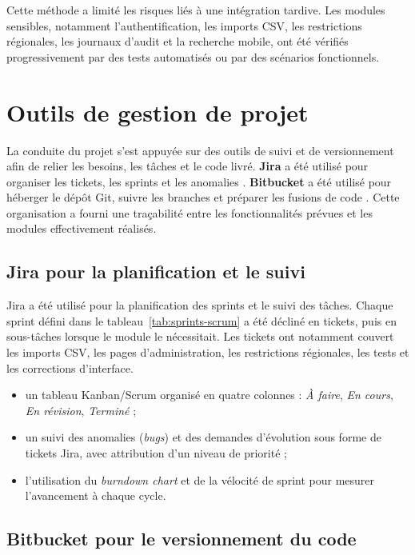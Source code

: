 Cette méthode a limité les risques liés à une intégration tardive. Les modules sensibles, notamment
l'authentification, les imports CSV, les restrictions régionales, les journaux d'audit et la recherche mobile,
ont été vérifiés progressivement par des tests automatisés ou par des scénarios fonctionnels.

\section{Outils de gestion de projet}
\label{sec:outils-gestion}

La conduite du projet s'est appuyée sur des outils de suivi et de versionnement afin de relier les besoins,
les tâches et le code livré. \textbf{Jira} a été utilisé pour organiser les tickets, les sprints et les
anomalies \cite{atlassian_jira_sprints}. \textbf{Bitbucket} a été utilisé pour héberger le dépôt Git, suivre les
branches et préparer les fusions de code \cite{atlassian_bitbucket_guides}. Cette organisation a fourni une traçabilité
entre les fonctionnalités prévues et les modules effectivement réalisés.

\subsection{Jira pour la planification et le suivi}

Jira a été utilisé pour la planification des sprints et le suivi des tâches. Chaque sprint défini dans le
tableau~\ref{tab:sprints-scrum} a été décliné en tickets, puis en sous-tâches lorsque le module le
nécessitait. Les tickets ont notamment couvert les imports CSV, les pages d'administration, les restrictions
régionales, les tests et les corrections d'interface.

\begin{itemize}
    \item un tableau Kanban/Scrum organisé en quatre colonnes : \emph{À faire}, \emph{En cours},
    \emph{En révision}, \emph{Terminé} ;
    \item un suivi des anomalies (\emph{bugs}) et des demandes d'évolution sous forme de tickets Jira,
    avec attribution d'un niveau de priorité ;
    \item l'utilisation du \emph{burndown chart} et de la vélocité de sprint pour mesurer
    l'avancement à chaque cycle.
\end{itemize}

\subsection{Bitbucket pour le versionnement du code}

